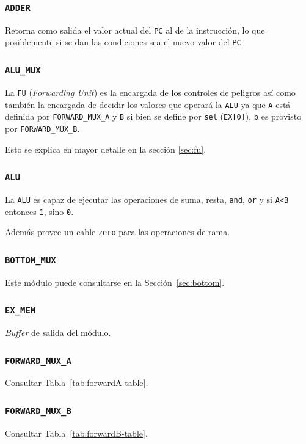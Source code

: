 \documentclass[a4paper]{article}
\begin{document}
\subsubsection{\texttt{ADDER}} \label{sec:adder}
Retorna como salida el valor actual del \texttt{PC} al de la instrucción, lo que posiblemente si se dan las condiciones sea el nuevo valor del \texttt{PC}.

\subsubsection{\texttt{ALU\_MUX}}
La \texttt{FU} (\textit{Forwarding Unit}) es la encargada de los controles de peligros así como también la encargada de decidir los valores que operará la \texttt{ALU} ya que \texttt{A} está definida por \texttt{FORWARD\_MUX\_A} y \texttt{B} si bien se define por \texttt{sel} (\texttt{EX[0]}), \texttt{b} es provisto por \texttt{FORWARD\_MUX\_B}.

Esto se explica en mayor detalle en la sección \ref{sec:fu}.

\subsubsection{\texttt{ALU}}
La \texttt{ALU} es capaz de ejecutar las operaciones de suma, resta, \texttt{and}, \texttt{or}  y si \texttt{A<B} entonces \texttt{1}, sino \texttt{0}.

Además provee un cable \texttt{zero} para las operaciones de rama.

\subsubsection{\texttt{BOTTOM\_MUX}} \label{subsubsection}
Este módulo puede consultarse en la Sección~\ref{sec:bottom}.

\subsubsection{\texttt{EX\_MEM}}
\textit{Buffer} de salida del módulo.

\subsubsection{\texttt{FORWARD\_MUX\_A}}
Consultar Tabla~\ref{tab:forwardA-table}.

\subsubsection{\texttt{FORWARD\_MUX\_B}}
Consultar Tabla~\ref{tab:forwardB-table}.
\end{document}
